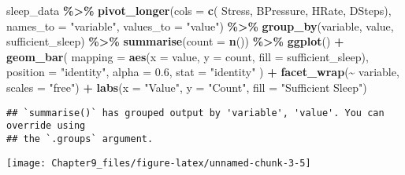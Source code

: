 \documentclass[
  11pt,
]{article}
\newenvironment{Shaded}{\begin{snugshade}}{\end{snugshade}}
\newcommand{\AttributeTok}[1]{\textcolor[rgb]{0.13,0.29,0.53}{#1}}
\newcommand{\FloatTok}[1]{\textcolor[rgb]{0.00,0.00,0.81}{#1}}
\newcommand{\FunctionTok}[1]{\textcolor[rgb]{0.13,0.29,0.53}{\textbf{#1}}}
\newcommand{\NormalTok}[1]{#1}
\newcommand{\SpecialCharTok}[1]{\textcolor[rgb]{0.81,0.36,0.00}{\textbf{#1}}}
\newcommand{\StringTok}[1]{\textcolor[rgb]{0.31,0.60,0.02}{#1}}
\begin{document}
\begin{Shaded}
\begin{Highlighting}[]
\NormalTok{sleep\_data }\SpecialCharTok{\%\textgreater{}\%}
  \FunctionTok{pivot\_longer}\NormalTok{(}\AttributeTok{cols =} \FunctionTok{c}\NormalTok{( Stress, BPressure, HRate, DSteps), }\AttributeTok{names\_to =} \StringTok{"variable"}\NormalTok{, }\AttributeTok{values\_to =} \StringTok{"value"}\NormalTok{) }\SpecialCharTok{\%\textgreater{}\%}
  \FunctionTok{group\_by}\NormalTok{(variable, value, sufficient\_sleep) }\SpecialCharTok{\%\textgreater{}\%}
  \FunctionTok{summarise}\NormalTok{(}\AttributeTok{count =} \FunctionTok{n}\NormalTok{()) }\SpecialCharTok{\%\textgreater{}\%}
  \FunctionTok{ggplot}\NormalTok{() }\SpecialCharTok{+}
  \FunctionTok{geom\_bar}\NormalTok{(}
    \AttributeTok{mapping =} \FunctionTok{aes}\NormalTok{(}\AttributeTok{x =}\NormalTok{ value, }\AttributeTok{y =}\NormalTok{ count, }\AttributeTok{fill =}\NormalTok{ sufficient\_sleep),}
    \AttributeTok{position =} \StringTok{"identity"}\NormalTok{,}
    \AttributeTok{alpha =} \FloatTok{0.6}\NormalTok{,}
    \AttributeTok{stat =} \StringTok{"identity"}
\NormalTok{  ) }\SpecialCharTok{+}
  \FunctionTok{facet\_wrap}\NormalTok{(}\SpecialCharTok{\textasciitilde{}}\NormalTok{ variable, }\AttributeTok{scales =} \StringTok{"free"}\NormalTok{) }\SpecialCharTok{+}
  \FunctionTok{labs}\NormalTok{(}\AttributeTok{x =} \StringTok{"Value"}\NormalTok{, }\AttributeTok{y =} \StringTok{"Count"}\NormalTok{, }\AttributeTok{fill =} \StringTok{"Sufficient Sleep"}\NormalTok{)}
\end{Highlighting}
\end{Shaded}

\begin{verbatim}
## `summarise()` has grouped output by 'variable', 'value'. You can override using
## the `.groups` argument.
\end{verbatim}

\begin{center}\texttt{[image: Chapter9\_files/figure-latex/unnamed-chunk-3-5]} \end{center}
\end{document}
